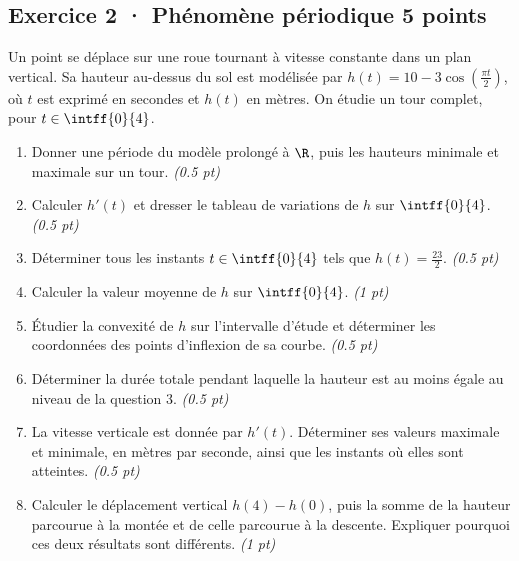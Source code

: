 \subsection*{Exercice 2 · Phénomène périodique \hfill 5 points}Un point se déplace sur une roue tournant à vitesse constante dans un plan vertical. Sa hauteur au-dessus du sol est modélisée par $h(t)=10-3\cos\left(\frac{\pi t}{2}\right)$, où $t$ est exprimé en secondes et $h(t)$ en mètres. On étudie un tour complet, pour $t\in\intff{0}{4}$.

\begin{enumerate}

\item Donner une période du modèle prolongé à $\R$, puis les hauteurs minimale et maximale sur un tour. \hfill\textit{(\num{0,5} pt)}

\item Calculer $h'(t)$ et dresser le tableau de variations de $h$ sur $\intff{0}{4}$. \hfill\textit{(\num{0,5} pt)}

\item Déterminer tous les instants $t\in\intff{0}{4}$ tels que $h(t)=\frac{23}{2}$. \hfill\textit{(\num{0,5} pt)}

\item Calculer la valeur moyenne de $h$ sur $\intff{0}{4}$. \hfill\textit{(1 pt)}

\item Étudier la convexité de $h$ sur l'intervalle d'étude et déterminer les coordonnées des points d'inflexion de sa courbe. \hfill\textit{(\num{0,5} pt)}

\item Déterminer la durée totale pendant laquelle la hauteur est au moins égale au niveau de la question 3. \hfill\textit{(\num{0,5} pt)}

\item La vitesse verticale est donnée par $h'(t)$. Déterminer ses valeurs maximale et minimale, en mètres par seconde, ainsi que les instants où elles sont atteintes. \hfill\textit{(\num{0,5} pt)}

\item Calculer le déplacement vertical $h(4)-h(0)$, puis la somme de la hauteur parcourue à la montée et de celle parcourue à la descente. Expliquer pourquoi ces deux résultats sont différents. \hfill\textit{(1 pt)}

\end{enumerate}

\mxnewpage{}

